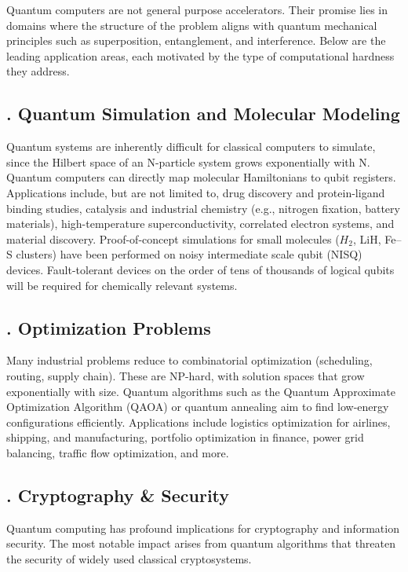 \documentclass{elbioimp2}
\begin{document}
Quantum computers are not general purpose accelerators. Their promise lies in domains where the structure of the problem aligns with quantum mechanical principles such as superposition, entanglement, and interference. Below are the leading application areas, each motivated by the type of computational hardness they address.

\subsection{. Quantum Simulation and Molecular Modeling}

Quantum systems are inherently difficult for classical computers to simulate, since the Hilbert space of an N-particle system grows exponentially with N. Quantum computers can directly map molecular Hamiltonians to qubit registers. Applications include, but are not limited to, drug discovery and protein-ligand binding studies, catalysis and industrial chemistry (e.g., nitrogen fixation, battery materials), high-temperature superconductivity, correlated electron systems, and material discovery. Proof-of-concept simulations for small molecules ($H_2$, LiH, Fe–S clusters) have been performed on noisy intermediate scale qubit (NISQ) devices. Fault-tolerant devices on the order of tens of thousands of logical qubits will be required for chemically relevant systems.

\subsection{. Optimization Problems}

Many industrial problems reduce to combinatorial optimization (scheduling, routing, supply chain). These are NP-hard, with solution spaces that grow exponentially with size. Quantum algorithms such as the Quantum Approximate Optimization Algorithm (QAOA) or quantum annealing aim to find low-energy configurations efficiently. Applications include logistics optimization for airlines, shipping, and manufacturing, portfolio optimization in finance, power grid balancing, traffic flow optimization, and more.

\subsection{. Cryptography \& Security}

Quantum computing has profound implications for cryptography and information security. The most notable impact arises from quantum algorithms that threaten the security of widely used classical cryptosystems.
\end{document}
